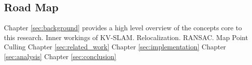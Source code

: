 \subsection{Road Map}

Chapter \ref{sec:background} provides a high level overview of the concepts core to this research. Inner workings of KV-SLAM. Relocalization. RANSAC. Map Point Culling
Chapter \ref{sec:related_work}
Chapter \ref{sec:implementation}
Chapter \ref{sec:analysis}
Chapter \ref{sec:conclusion}